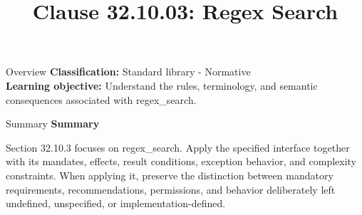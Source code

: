 \documentclass[10pt,letterpaper]{article}
\title{Clause 32.10.03: Regex Search}
\author{}
\date{}
\begin{document}
\maketitle
\begin{CornellOverviewBox}{Overview}
\textbf{Classification:} Standard library - Normative\\[2pt]
\textbf{Learning objective:} Understand the rules, terminology, and semantic consequences associated with regex\_search.
\end{CornellOverviewBox}\begin{CornellSummaryBox}{Summary}
{\sffamily\bfseries\color{Accent} Summary}\par\vspace{3pt}Section 32.10.3 focuses on regex\_search. Apply the specified interface together with its mandates, effects, result conditions, exception behavior, and complexity constraints. When applying it, preserve the distinction between mandatory requirements, recommendations, permissions, and behavior deliberately left undefined, unspecified, or implementation-defined.
\end{CornellSummaryBox}
\end{document}
